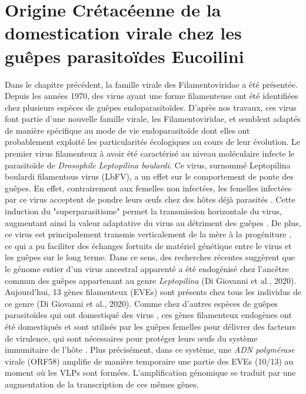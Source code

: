 \chapter{Origine Crétacéenne de la domestication virale chez les guêpes parasitoïdes Eucoilini}

Dans le chapitre précédent, la famille virale des Filamentoviridae a été présentée. Depuis les années 1970, des virus ayant une forme filamenteuse ont été identifiées chez plusieurs espèces de guêpes endoparasitoïdes. D'après nos travaux, ces virus font partie d'une nouvelle famille virale, les Filamentoviridae, et semblent adaptés de manière spécifique au mode de vie endoparasitoïde dont elles ont probablement exploité les particularités écologiques au cours de leur évolution. Le premier virus filamenteux à avoir été caractérisé au niveau moléculaire infecte le parasitoïde de \textit{Drosophile} \citep{lepetit_genome_2017}  \textit{Leptopilina boulardi}. Ce virus, surnommé Leptopilina boulardi filamentous virus (LbFV), a un effet sur le comportement de ponte des guêpes. En effet, contrairement aux femelles non infectées, les femelles infectées par ce virus acceptent de pondre leurs œufs chez des hôtes déjà parasités \citep{varaldi_infectious_2003,varaldi_artifical_2006}. Cette induction du "superparasitisme" permet la transmission horizontale du virus, augmentant ainsi la valeur adaptative du virus au détriment des guêpes \citep{gandon_superparasitism_2006}. De plus, ce virus est principalement transmis verticalement de la mère à la progéniture \citep{martinez_additional_2016}, ce qui a pu faciliter des échanges fortuits de matériel génétique entre le virus et les guêpes sur le long terme. Dans ce sens, des recherches récentes suggèrent que le génome entier d'un virus ancestral apparenté a été endogénisé chez l'ancêtre commun des guêpes appartenant au genre \textit{Leptopilina} (Di Giovanni et al., 2020). Aujourd'hui, 13 gènes filamenteux (EVEs) sont présents chez tous les individus de ce genre (Di Giovanni et al., 2020). Comme chez d'autres espèces de guêpes parasitoïdes qui ont domestiqué des virus  \citep{bezier_polydnaviruses_2009,volkoff_analysis_2010,pichon_recurrent_2015,burke_common_2019}, ces gènes filamenteux endogènes ont été domestiqués et sont utilisés par les guêpes femelles pour délivrer des facteurs de virulence, qui sont nécessaires pour protéger leurs œufs du système immunitaire de l'hôte \citep{colinet_convergent_2007,di_giovanni_behavior-manipulating_2020}. Plus précisément, dans ce système, une \textit{ADN polymérase} virale (ORF58) amplifie de manière temporaire une partie des EVEs (10/13) au moment où les VLPs sont formées. L'amplification génomique se traduit par une augmentation de la transcription de ces mêmes gènes. \\

